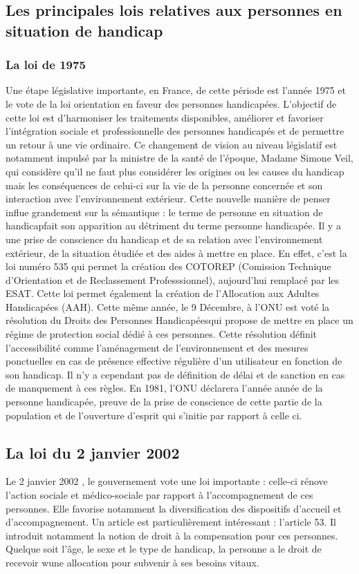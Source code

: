 \subsection{Les principales lois relatives aux personnes en situation de handicap}
\subsubsection{La loi de 1975}
Une étape législative importante, en France, de cette période est l'année 1975 et le vote de la loi \og orientation en faveur des personnes handicapées\fg \cite{Didier2005}. L'objectif de cette loi est d'harmoniser les traitements disponibles, améliorer et favoriser l'intégration sociale et professionnelle des personnes handicapés et de permettre un retour à une vie \og ordinaire\fg . Ce changement de vision au niveau législatif est notamment impulsé par la ministre de la santé de l'époque, Madame Simone Veil, qui considère qu'il ne faut plus considérer les origines ou les causes du handicap mais les conséquences de celui-ci sur la vie de la personne concernée et son interaction avec l'environnement extérieur. Cette nouvelle manière de penser influe grandement sur la sémantique : le terme de \og personne en situation de handicap\fg fait son apparition au détriment du terme \og personne handicapée\fg . Il y a une prise de conscience du handicap et de sa relation avec l'environnement extérieur, de la situation étudiée et des aides à mettre en place. En effet, c'est la loi numéro 535 qui permet la création des COTOREP (Comission Technique d'Orientation et de Reclassement Professsionnel), aujourd'hui remplacé par les ESAT. Cette loi permet également la création de l'Allocation aux Adultes Handicapées (AAH). 
Cette même année, le 9 Décembre, à l'ONU est voté la résolution du \og Droits des Personnes Handicapées\fg qui propose de mettre en place un régime de protection social dédié à ces personnes. Cette résolution définit l’accessibilité comme l'aménagement de l’environnement et des mesures ponctuelles en cas de présence effective régulière d’un utilisateur en fonction de son handicap. Il n'y a cependant pas de définition de délai et de sanction en cas de manquement à ces règles. En 1981, l'ONU déclarera l'année \og année de la personne handicapée\fg , preuve de la prise de conscience de cette partie de la population et de l'ouverture d'esprit qui s'initie par rapport à celle ci.

\subsection{La loi du 2 janvier 2002}
Le 2 janvier 2002 \cite{Levy2002}, le gouvernement vote une loi importante : celle-ci rénove l'action sociale et médico-sociale par rapport à l'accompagnement de ces personnes. Elle favorise notamment la diversification des dispositifs d'accueil et d'accompagnement. 
Un article est particulièrement intéressant : l'article 53. Il introduit notamment la notion de droit à la compensation pour ces personnes. Quelque soit l'âge, le sexe et le type de handicap, la personne a le droit de recevoir wune allocation pour subvenir à ses besoins vitaux. 

